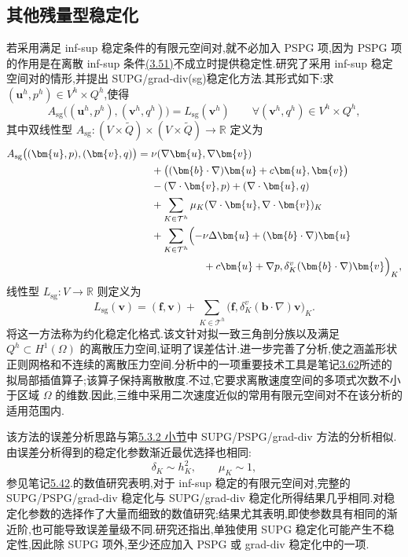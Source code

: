 \subsection{其他残量型稳定化}\label{subsec:oseen-other-residual-stabilizations}

\begin{note}\label{note:oseen-sg-pspg-omission}
若采用满足 inf-sup 稳定条件的有限元空间对,就不必加入 PSPG 项,因为 PSPG 项的作用是在离散 inf-sup 条件\hyperref[eq:discrete-infsup-condition]{(3.51)}不成立时提供稳定性.\textcite{GelhardEtAl2005}研究了采用 inf-sup 稳定空间对的情形,并提出 SUPG/grad-div(sg)稳定化方法.其形式如下:求 $(\bm{u}^h,p^h)\in V^h\times Q^h$,使得
\[
 A_{\mathrm{sg}}\bigl((\bm{u}^h,p^h),(\bm{v}^h,q^h)\bigr)
   =L_{\mathrm{sg}}(\bm{v}^h)
   \qquad\forall(\bm{v}^h,q^h)\in V^h\times Q^h,
\]
其中双线性型 $A_{\mathrm{sg}}:(V\times\widetilde Q)\times(V\times\widetilde Q)\to\mathbb{R}$ 定义为
\[
\begin{aligned}
 A_{\mathrm{sg}}\bigl((\bm{u},p),(\bm{v},q)\bigr)
  ={}&\nu(\nabla\bm{u},\nabla\bm{v})\\
   &+\bigl((\bm{b}\cdot\nabla)\bm{u}+c\bm{u},\bm{v}\bigr)\\
   &-(\nabla\cdot\bm{v},p)+(\nabla\cdot\bm{u},q)\\
   &+\sum_{K\in\mathcal{T}^h}
       \mu_K(\nabla\cdot\bm{u},\nabla\cdot\bm{v})_K\\
   &+\sum_{K\in\mathcal{T}^h}\Bigl(-\nu\Delta\bm{u}
          +(\bm{b}\cdot\nabla)\bm{u}\\
   &\hspace{5em}+c\bm{u}+\nabla p,
          \delta_K^v(\bm{b}\cdot\nabla)\bm{v}\Bigr)_K,
\end{aligned}
\]
线性型 $L_{\mathrm{sg}}:V\to\mathbb{R}$ 则定义为
\[
 L_{\mathrm{sg}}(\bm{v})
   =(\bm{f},\bm{v})
    +\sum_{K\in\mathcal{T}^h}
       \bigl(\bm{f},\delta_K^v(\bm{b}\cdot\nabla)\bm{v}\bigr)_K.
\]
\textcite{GelhardEtAl2005}将这一方法称为约化稳定化格式.该文针对拟一致三角剖分族以及满足 $Q^h\subset H^1(\Omega)$ 的离散压力空间,证明了误差估计.\textcite{MatthiesLubeRoehe2009}进一步完善了分析,使之涵盖形状正则网格和不连续的离散压力空间.分析中的一项重要技术工具是笔记\hyperref[note:alternative-best-approximation-vdiv]{3.62}所述的拟局部插值算子;该算子保持离散散度.不过,它要求离散速度空间的多项式次数不小于区域 $\Omega$ 的维数.因此,三维中采用二次速度近似的常用有限元空间对不在该分析的适用范围内.

该方法的误差分析思路与第\hyperref[subsec:oseen-spg-stabilization]{5.3.2 小节}中 SUPG/PSPG/grad-div 方法的分析相似.由误差分析得到的稳定化参数渐近最优选择也相同:
\[
  \delta_K\sim h_K^2,\qquad \mu_K\sim1,
\]
参见笔记\hyperref[note:oseen-optimal-stabilization]{5.42}.\textcite{GelhardEtAl2005}的数值研究表明,对于 inf-sup 稳定的有限元空间对,完整的 SUPG/PSPG/grad-div 稳定化与 SUPG/grad-div 稳定化所得结果几乎相同.\textcite{MatthiesLubeRoehe2009}对稳定化参数的选择作了大量而细致的数值研究;结果尤其表明,即使参数具有相同的渐近阶,也可能导致误差量级不同.研究还指出,单独使用 SUPG 稳定化可能产生不稳定性,因此除 SUPG 项外,至少还应加入 PSPG 或 grad-div 稳定化中的一项.
\end{note}

